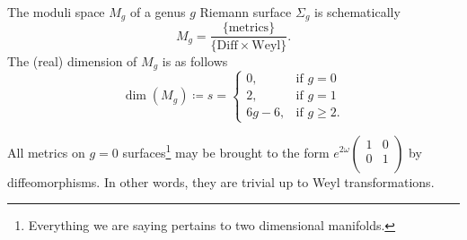 The moduli space $M_g$ of a genus $g$ Riemann surface $\Sigma_g$ is schematically
\begin{equation}
  M_g = \frac{\{\text{metrics}\}}{\{\text{Diff} \times \text{Weyl}\}}.
\end{equation}
The (real) dimension of $M_g$ is as follows
\begin{equation}
  \dim(M_g) \coloneqq s =
  \begin{cases}
    0, & \text{if } g = 0 \\
    2, & \text{if } g = 1 \\
    6g-6, & \text{if } g \geq 2.
  \end{cases}
\end{equation}
\begin{example}[$g = 0$]
  All metrics on $g = 0$  surfaces\footnote{Everything we are saying pertains to two dimensional manifolds.} may be brought to the form $e^{2 \omega} 
  \begin{pmatrix}
   1 & 0 \\
   0 & 1 \\
  \end{pmatrix} $ by diffeomorphisms.
  In other words, they are trivial up to Weyl transformations.
\end{example}
